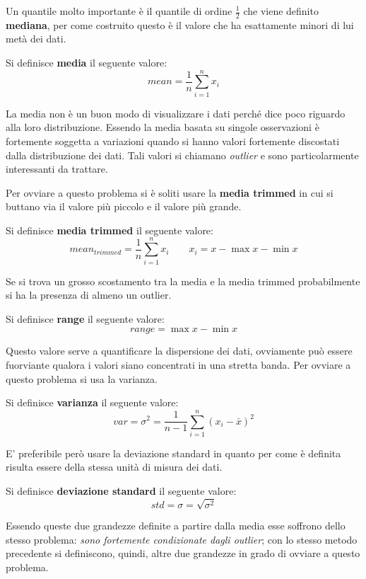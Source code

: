 Un quantile molto importante è il quantile di ordine $\frac{1}{2}$ che viene definito \textbf{mediana}, per come costruito questo è il valore che ha esattamente minori di lui  metà dei dati.

\begin{defn}
	Si definisce \textbf{media} il seguente valore:
	\[mean = \frac{1}{n}\sum_{i=1}^{n}x_i\]
\end{defn}


La media non è un buon modo di visualizzare i dati perché dice poco riguardo alla loro distribuzione. Essendo la media basata su singole osservazioni è fortemente soggetta a variazioni quando si hanno valori fortemente discostati dalla distribuzione dei dati.
Tali valori si chiamano \textit{outlier} e sono particolarmente interessanti da trattare.

Per ovviare a questo problema si è soliti usare  la \textbf{media trimmed} in cui si buttano via il valore più piccolo e il valore più grande. 
\begin{defn}
	Si definisce \textbf{media trimmed} il seguente valore:
	\[mean_{trimmed} = \frac{1}{n}\sum_{i=1}^{n}x_i  \qquad x_{i} = x - \max{x}- \min{x}\]
\end{defn}

Se si trova un grosso scostamento tra la media e la media trimmed probabilmente si ha la presenza di almeno un outlier.

\begin{defn}
	Si definisce \textbf{range} il seguente valore:
	\[ range = \max{x}- \min{x}\]
\end{defn}

Questo valore serve a quantificare la dispersione dei dati, ovviamente può essere fuorviante qualora i valori siano concentrati in una stretta banda. Per ovviare a questo problema si usa la varianza.

\begin{defn}
	Si definisce \textbf{varianza} il seguente valore:
	\[ var =  \sigma^{2} =\frac{1}{n - 1 }\sum_{i = 1}^{n} (x_{i} - \bar{x})^{2}\]	
\end{defn}

E' preferibile però usare la deviazione standard in quanto per come è definita risulta essere della stessa unità di misura dei dati.
\begin{defn}
	Si definisce \textbf{deviazione standard} il seguente valore:
	\[ std = \sigma =  \sqrt{\sigma^{2}} \]
\end{defn}

Essendo queste due grandezze definite a partire dalla media esse soffrono dello stesso problema: \textit{sono fortemente condizionate dagli outlier}; con lo stesso metodo precedente si definiscono, quindi, altre due grandezze in grado di ovviare a questo problema.

